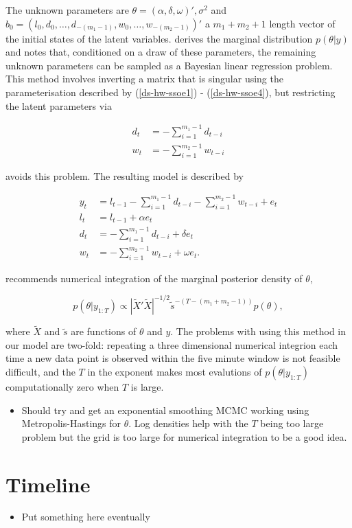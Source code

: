 \documentclass[12pt,a4paper]{article}%
\numberwithin{equation}{section}
\begin{document}
The unknown parameters are $\theta = (\alpha, \delta, \omega)', \sigma^2$ and $b_0 = (l_0, d_0, \dots, d_{-(m_1 - 1)}, w_0, \dots, w_{-(m_2 - 1)})'$ a $m_1 + m_2 + 1$ length vector of the initial states of the latent variables. 
\citet{Forbes2000} derives the marginal distribution $p(\theta | y)$ and notes that, conditioned on a draw of these parameters, the remaining unknown parameters can be sampled as a Bayesian linear regression problem. This method involves inverting a matrix that is singular using the parameterisation described by (\ref{ds-hw-ssoe1}) - (\ref{ds-hw-ssoe4}), but restricting the latent parameters via

\begin{align}
d_t &= - \sum_{i=1}^{m_1-1} d_{t-i} \\
w_t &= - \sum_{i=1}^{m_2-1} w_{t-i}
\end{align}

avoids this problem. The resulting model is described by

\begin{align}
y_t &= l_{t-1} - \sum_{i = 1}^{m_1 - 1}d_{t-i} - \sum_{i = 1}^{m_2 - 1}w_{t-i} + e_t \label{ds-hw-rp1} \\
l_t &= l_{t-1} + \alpha e_t \label{ds-hw-rp2} \\
d_t &= - \sum_{i = 1}^{m_1 - 1}d_{t-i} + \delta e_t \label{ds-hw-rp3} \\
w_t &= - \sum_{i = 1}^{m_2 - 1}w_{t-i} + \omega e_t \label{ds-hw-rp4}.
\end{align}

\citet{Forbes2000} recommends numerical integration of the marginal posterior density of $\theta$,

\begin{equation}
\label{exp-sm-marginal}
p(\theta | y_{1:T}) \propto \left| \widetilde{X}' \widetilde{X} \right|^{-1/2} \tilde{s}^{-(T-(m_1 + m_2 - 1))} p(\theta),
\end{equation}

where $\widetilde{X}$ and $\tilde{s}$ are functions of $\theta$ and $y$. The problems with using this method in our model are two-fold: repeating a three dimensional numerical integrion each time a new data point is observed within the five minute window is not feasible difficult, and the $T$ in the exponent makes most evalutions of $p(\theta | y_{1:T})$ computationally zero when $T$ is large. 

\begin{itemize}
\item Should try and get an exponential smoothing MCMC working using Metropolis-Hastings for $\theta$. Log densities help with the $T$ being too large problem but the grid is too large for numerical integration to be a good idea.
\end{itemize}

\section{Timeline}
\begin{itemize}
\item Put something here eventually
\end{itemize}



\end{document}
